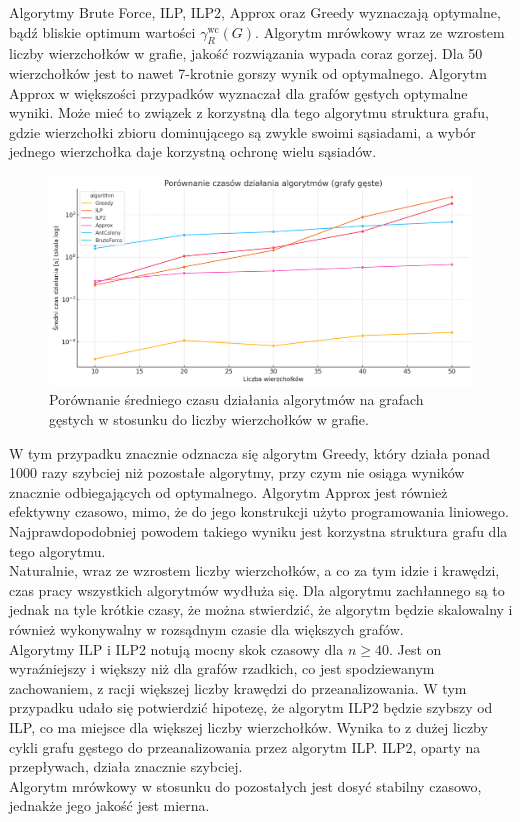     Algorytmy Brute Force, ILP, ILP2, Approx oraz Greedy wyznaczają optymalne, bądź bliskie optimum wartości $\gamma^{\text{wc}}_R(G)$. Algorytm mrówkowy wraz ze wzrostem liczby wierzchołków w grafie, jakość rozwiązania wypada coraz gorzej. Dla 50 wierzchołków jest to nawet 7-krotnie gorszy wynik od optymalnego. Algorytm Approx w większości przypadków wyznaczał dla grafów gęstych optymalne wyniki. Może mieć to związek z korzystną dla tego algorytmu struktura grafu, gdzie wierzchołki zbioru dominującego są zwykle swoimi sąsiadami, a wybór jednego wierzchołka daje korzystną ochronę wielu sąsiadów.

    \begin{figure}[H]
        \centering
        \includegraphics[width=\textwidth]{assets/dense.png}
        \caption{Porównanie średniego czasu działania algorytmów na grafach gęstych w stosunku do liczby wierzchołków w grafie.}
        \label{fig:densePlot}
    \end{figure}

    W tym przypadku znacznie odznacza się algorytm Greedy, który działa ponad 1000 razy szybciej niż pozostałe algorytmy, przy czym nie osiąga wyników znacznie odbiegających od optymalnego. Algorytm Approx jest również efektywny czasowo, mimo, że do jego konstrukcji użyto programowania liniowego. Najprawdopodobniej powodem takiego wyniku jest korzystna struktura grafu dla tego algorytmu.\\
    Naturalnie, wraz ze wzrostem liczby wierzchołków, a co za tym idzie i krawędzi, czas pracy wszystkich algorytmów wydłuża się. Dla algorytmu zachłannego są to jednak na tyle krótkie czasy, że można stwierdzić, że algorytm będzie skalowalny i również wykonywalny w rozsądnym czasie dla większych grafów.\\
    Algorytmy ILP i ILP2 notują mocny skok czasowy dla $n \geq 40 $. Jest on wyraźniejszy i większy niż dla grafów rzadkich, co jest spodziewanym zachowaniem, z racji większej liczby krawędzi do przeanalizowania. W tym przypadku udało się potwierdzić hipotezę, że algorytm ILP2 będzie szybszy od ILP, co ma miejsce dla większej liczby wierzchołków. Wynika to z dużej liczby cykli grafu gęstego do przeanalizowania przez algorytm ILP. ILP2, oparty na przepływach, działa znacznie szybciej. \\
    Algorytm mrówkowy w stosunku do pozostałych jest dosyć stabilny czasowo, jednakże jego jakość jest mierna.\\
    
